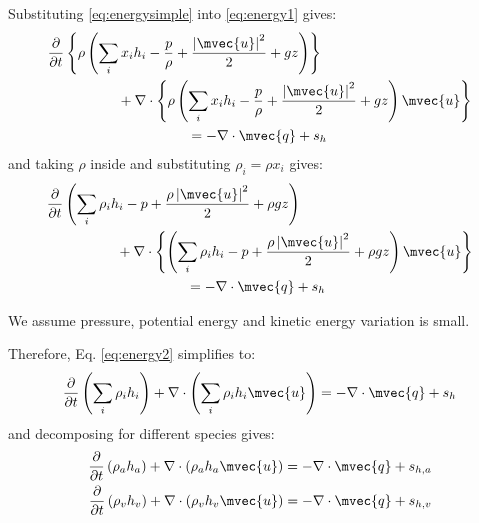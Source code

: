 Substituting \ref{eq:energysimple} into \ref{eq:energy1} gives:
\begin{equation}
\begin{split}
&\frac{\partial }{\partial t} \left\{\rho \left( \sum_i x_i h_i  - \frac{p}{\rho} + \frac{\left| \mvec{u} \right|^2}{2} + gz  \right) \right\}\\
& \hspace{5em} + \nabla  \cdot \left\{ \rho \left(   \sum_i x_i h_i  - \frac{p}{\rho} + \frac{\left| \mvec{u} \right|^2}{2} + gz  \right) \mvec{u} \right\} \\
& \hspace{10em}  =  - \nabla  \cdot \mvec{q} + s_h
\end{split}
\end{equation}
and taking $\rho$ inside and substituting $\rho_i = \rho x_i $ gives:
\begin{equation}
\begin{split}
&\frac{\partial }{\partial t} \left( \sum_i \rho_i h_i  - p + \frac{\rho \left| \mvec{u} \right|^2}{2} + \rho gz  \right) \\
& \hspace{5em} + \nabla  \cdot \left\{ \left(   \sum_i \rho_i h_i  - p + \frac{\rho \left| \mvec{u} \right|^2}{2} + \rho gz  \right) \mvec{u} \right\} \\
& \hspace{10em} =  - \nabla  \cdot \mvec{q} + s_h
\end{split}
\label{eq:energy2}
\end{equation}

\begin{assumption}
	We assume pressure, potential energy and kinetic energy variation is small. 
\end{assumption}	

Therefore, Eq. \ref{eq:energy2} simplifies to:
\begin{equation}
\frac{\partial }{\partial t} \left( \sum_i \rho_i h_i \right) +   \nabla  \cdot \left( \sum_i \rho_i h_i \mvec{u}\right) =  - \nabla  \cdot \mvec{q} + s_h
\end{equation}
and decomposing for different species gives:
\begin{align}
	\frac{\partial }{\partial t} \left( \rho_a h_a \right) +   \nabla  \cdot \left( \rho_a h_a \mvec{u}\right) =  - \nabla  \cdot \mvec{q} + s_{h,a}\\
	\frac{\partial }{\partial t} \left( \rho_v h_v \right) +   \nabla  \cdot \left( \rho_v h_v \mvec{u}\right) =  - \nabla  \cdot \mvec{q} + s_{h,v}
\end{align}

